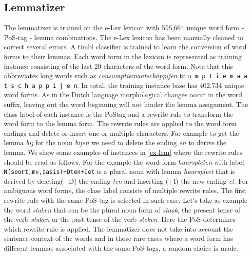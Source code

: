\documentclass{book}
\begin{document}
\subsection{Lemmatizer}
\label{sec-bg-lem}
The lemmatizer is trained on the e-Lex lexicon \cite{e-lex} with 595,664 unique word form - PoS-tag - lemma combinations. The e-Lex lexicon has been manually cleaned to correct several errors.
A timbl classifier is trained to learn the conversion of word forms to their lemmas. Each word form in the lexicon is represented as training instance consisting of the last 20 characters of the word form. Note that this abbreviates long words such as {\it consumptiemaatschappijen} to {\tt u m p t i e m a a t s c h a p p i j e n}.%
In total, the training instance base has 402,734 unique word forms.
As in the Dutch language morphological changes occur in the word suffix,  leaving out the word beginning will not hinder the lemma assignment.
The class label of each instance is the PoStag and a rewrite rule to transform the word form to the lemma form. The rewrite rules are applied to the word form endings and delete or insert one or multiple characters. For example to get the lemma {\it bij} for the noun {\it bijen} we need to delete the ending {\it en} to derive the lemma.
We show some examples of instances in \ref{ex-lem} where the rewrite rules should be read as follows. For the example the word form {\it haarspleten} with label {\tt N(soort,mv,basis)+Dten+Iet} is a plural noun with lemma {\it haarspleet} that is derived by deleting(+D) the ending {\it ten} and inserting (+I) the new ending {\it et}.
For ambiguous word forms, the class label consists of multiple rewrite rules. The first rewrite rule with the same PoS tag is selected in such case.
Let's take as example the word {\it staken} that can be the plural noun form of {\it staak}, the present tense of the verb {\it staken} or the past tense of the verb {\it steken}. Here the PoS determines which rewrite rule is applied.
The lemmatizer does not take into account the sentence context of the words and in those rare cases where a word form has different lemmas associated with the same PoS-tags, a random choice is made.
\end{document}
